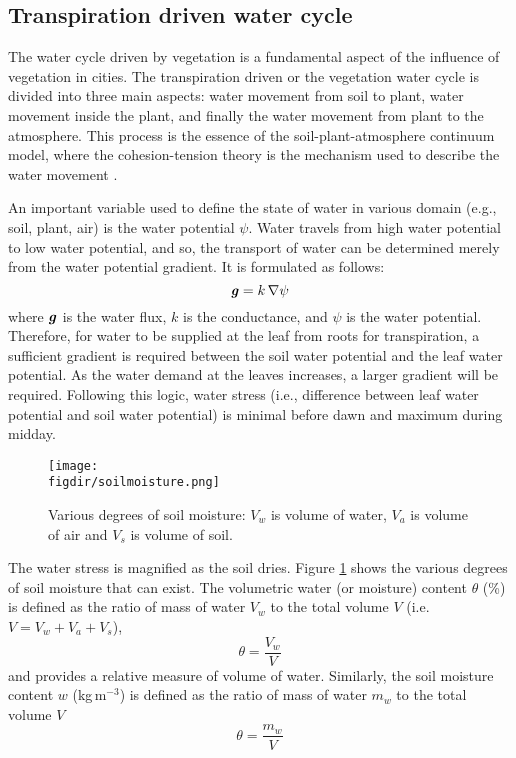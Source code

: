 \subsection{Transpiration driven water cycle}

The water cycle driven by vegetation is a fundamental aspect of the influence of vegetation in cities. The transpiration driven or the vegetation water cycle is divided into three main aspects: water movement from soil to plant, water movement inside the plant, and finally the water movement from plant to the atmosphere. This process is the essence of the soil-plant-atmosphere continuum model, where the cohesion-tension theory is the mechanism used to describe the water movement \citep{Dixon1895}. 

An important variable used to define the state of water in various domain (e.g., soil, plant, air) is the water potential $\psi$. Water travels from high water potential to low water potential, and so, the transport of water can be determined merely from the water potential gradient. It is formulated as follows:
\begin{equation}
\textbf{\textit{g}} = k\,\nabla \psi
\end{equation}
where $\textbf{\textit{g}}$ is the water flux, $k$ is the conductance, and $\psi$ is the water potential. Therefore, for water to be supplied at the leaf from roots for transpiration, a sufficient gradient is required between the soil water potential and the leaf water potential. As the water demand at the leaves increases, a larger gradient will be required. Following this logic, water stress (i.e., difference between leaf water potential and soil water potential) is minimal before dawn and maximum during midday. 

\begin{figure}[h]
	\centering
	\texttt{[image: \\figdir/soilmoisture.png]}
	\caption{Various degrees of soil moisture: $V_w$ is volume of water, $V_a$ is volume of air and $V_s$ is volume of soil.}
	\label{fig:soilmoisture}
\end{figure}

The water stress is magnified as the soil dries. Figure \ref{fig:soilmoisture} shows the various degrees of soil moisture that can exist. The volumetric water (or moisture) content $\theta$ (\%) is defined as the ratio of mass of water $V_w$ to the total volume $V$ (i.e. $V=V_w+V_a+V_s$),
\begin{equation}
\theta = \frac{V_w}{V}
\end{equation}
and provides a relative measure of volume of water. Similarly, the soil moisture content $w$ (kg\,m$^{-3}$) is defined as the ratio of mass of water $m_w$ to the total volume $V$
\begin{equation}
\theta = \frac{m_w}{V}
\end{equation}

